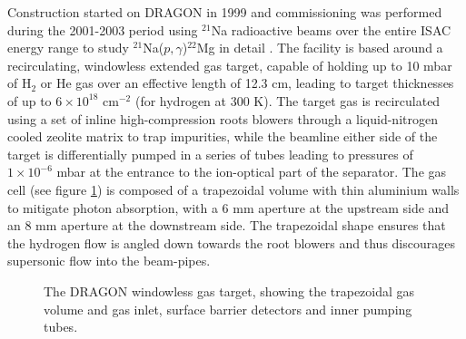 Construction started on DRAGON in 1999 and commissioning was performed during the 2001-2003 period using $^{21}$Na radioactive beams over the entire ISAC energy range to study $^{21}$Na($p,\gamma$)$^{22}$Mg in detail \cite{dau04}. The facility is based around a recirculating, windowless extended gas target, capable of holding up to 10 mbar of H$_{2}$ or He gas over an effective length of 12.3 cm, leading to target thicknesses of up to $6 \times 10^{18}$ cm$^{-2}$ (for hydrogen at 300 K). The target gas is recirculated using a set of inline high-compression roots blowers through a liquid-nitrogen cooled zeolite matrix to trap impurities, while the beamline either side of the target is differentially pumped in a series of tubes leading to pressures of ~$1\times 10^{-6}$ mbar at the entrance to the ion-optical part of the separator. The gas cell (see figure \ref{fig:dra_gas_target}) is composed of a trapezoidal volume with thin aluminium walls to mitigate photon absorption, with a 6 mm aperture at the upstream side and an 8 mm aperture at the downstream side. The trapezoidal shape ensures that the hydrogen flow is angled down towards the root blowers and thus discourages supersonic flow into the beam-pipes. 

\begin{figure}
\caption{The DRAGON windowless gas target, showing the trapezoidal gas volume and gas inlet, surface barrier detectors and inner pumping tubes.  }
\label{fig:dra_gas_target}
\end{figure}


